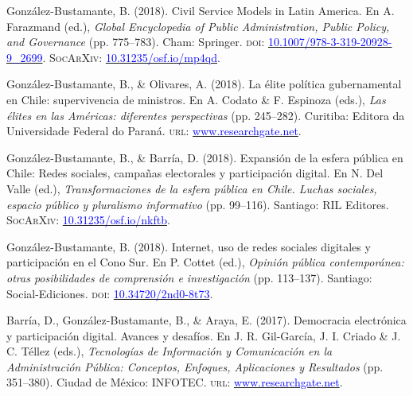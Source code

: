 \begin{publications}

\begin{benumerate}{12}

\item{González-Bustamante, B. (2018). Civil Service Models in Latin America. En A. Farazmand (ed.), {\itshape Global Encyclopedia of Public Administration, Public Policy, and Governance}  (pp. 775--783). Cham: Springer. {\scshape doi}: \href{https://doi.org/10.1007/978-3-319-20928-9\_2699}{\textcolor{blue}{10.1007/978-3-319-20928-9\_2699}}. {\scshape \footnotesize SocArXiv:} \href{https://doi.org/10.31235/osf.io/mp4qd}{\textcolor{blue}{10.31235/osf.io/mp4qd}}.}\vspace{1mm}

\item{González-Bustamante, B., \& Olivares, A. (2018). La élite política gubernamental en Chile: supervivencia de ministros. En A. Codato \& F. Espinoza (eds.), {\itshape Las élites en las Américas: diferentes perspectivas} (pp. 245--282). Curitiba: Editora da Universidade Federal do Paraná. {\scshape url:} \href{https://www.researchgate.net/publication/325699783_Elites_en_las_Americas_diferentes_perspectivas_Elites_in_the_Americas_Different_Perspectives}{\textcolor{blue}{www.researchgate.net}}.}\vspace{1mm}

\item{González-Bustamante, B., \& Barría, D. (2018). Expansión de la esfera pública en Chile: Redes sociales, campañas electorales y participación digital. En N. Del Valle (ed.), {\itshape Transformaciones de la esfera pública en Chile. Luchas sociales, espacio público y pluralismo informativo} (pp. 99--116). Santiago: RIL Editores. {\scshape \footnotesize SocArXiv:} \href{https://doi.org/10.31235/osf.io/nkftb}{\textcolor{blue}{10.31235/osf.io/nkftb}}.}\vspace{1mm}

\item{González-Bustamante, B. (2018). Internet, uso de redes sociales digitales y participación en el Cono Sur. En P. Cottet (ed.), {\itshape Opinión pública contemporánea: otras posibilidades de comprensión e investigación} (pp. 113--137). Santiago: Social-Ediciones. {\scshape doi:} \href{https://doi.org/10.34720/2nd0-8t73}{\textcolor{blue}{10.34720/2nd0-8t73}}.}\vspace{1mm}

\item{Barría, D., González-Bustamante, B., \& Araya, E. (2017). Democracia electrónica y participación digital. Avances y desafíos. En J. R. Gil-García, J. I. Criado \&  J. C. Téllez (eds.), {\itshape Tecnologías de Información y Comunicación en la Administración P\'ublica: Conceptos, Enfoques, Aplicaciones y Resultados} (pp. 351--380). Ciudad de México: INFOTEC. {\scshape url:} \href{https://www.researchgate.net/publication/321980289_Democracia_electronica_y_participacion_digital_Avances_y_desafios}{\textcolor{blue}{www.researchgate.net}}.}\vspace{1mm}


\end{benumerate}
\end{publications}
